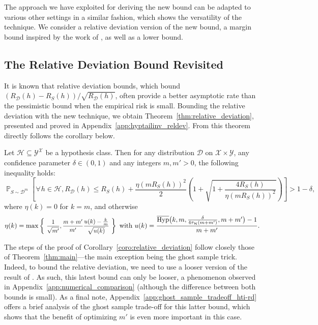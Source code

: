 \documentclass[twoside,11pt]{article}
\let\oldforall=\forall
\renewcommand{\forall}{\hspace{1pt}\oldforall\hspace{1pt}}
\newcommand{\pr}[1]{\left(#1\right)}
\newcommand{\cb}[1]{\left\{#1\right\}}
\newcommand{\D}{\mathcal{D}}
\renewcommand{\H}{{\mathcal{H}}}
\DeclareMathOperator*{\Prob}{\mathds{P}}
\newcommand{\prob}[2]{\Prob_{#1}\left[#2\right]}
\newcommand{\HypInv}{\overline{\textnormal{Hyp}}}
\begin{document}
The approach we have exploited for deriving the new bound can be adapted to various other settings in a similar fashion, which shows the versatility of the technique.
We consider a relative deviation version of the new bound, a margin bound inspired by the work of \citet{anthonybartlett99}, as well as a lower bound.


\subsection{The Relative Deviation Bound Revisited}
\label{ssec:relative_deviation_bound_revisited}

It is known that relative deviation bounds, which bound $(R_\D(h) - R_S(h))/\sqrt{R_\D(h)}$, often provide a better asymptotic rate than the pessimistic bound when the empirical risk is small.
Bounding the relative deviation with the new technique, we obtain Theorem~\ref{thm:relative_deviation}, presented and proved in Appendix~\ref{app:hyptailinv_reldev}.
From this theorem directly follows the corollary below.

\begin{corollary}
\label{coro:relative_deviation}
Let $\H \subseteq \mathcal{Y}^\mathcal{X}$ be a hypothesis class.
Then for any distribution $\D$ on $\mathcal{X} \times \mathcal{Y}$, any confidence parameter $\delta \in (0, 1)$ and any integers $m, m'>0$, the following inequality holds:
\begin{equation*}
\prob{S\sim\D^m}{\forall h \in \H, R_\D(h) \leq R_S(h) + \frac{\eta(m R_S(h))^2}{2} \pr{ 1 + \sqrt{1 + \frac{4 R_S(h)}{\eta(m R_S(h))^2 }} }} > 1 - \delta,
\end{equation*}
where $\eta(k) = 0$ for $k=m$, and otherwise
\begin{equation*}
\eta(k) = 
    \max\cb{ \scalebox{.9}{
        $\displaystyle \frac{1}{\sqrt{m'}}, \frac{m+m'}{m'} \frac{u(k) - \frac{k}{m}}{\sqrt{u(k)}}$
    }}
    \text{ with }
    u(k) = \frac{\HypInv\big(k, m, \textstyle\frac{\delta}{4 \tau_\H(m + m')}, m + m'\big) - 1}{m+m'}.
\end{equation*}
\end{corollary}

The steps of the proof of Corollary~\ref{coro:relative_deviation} follow closely those of Theorem~\ref{thm:main}---the main exception being the ghost sample trick.
Indeed, to bound the relative deviation, we need to use a looser version of the result of \cite{greenberg14}.
As such, this latest bound can only be looser, a phenomenon observed in Appendix~\ref{app:numerical_comparison} (although the difference between both bounds is small).
As a final note, Appendix~\ref{app:ghost_sample_tradeoff_hti-rd} offers a brief analysis of the ghost sample trade-off for this latter bound, which shows that the benefit of optimizing $m'$ is even more important in this case.
\end{document}
